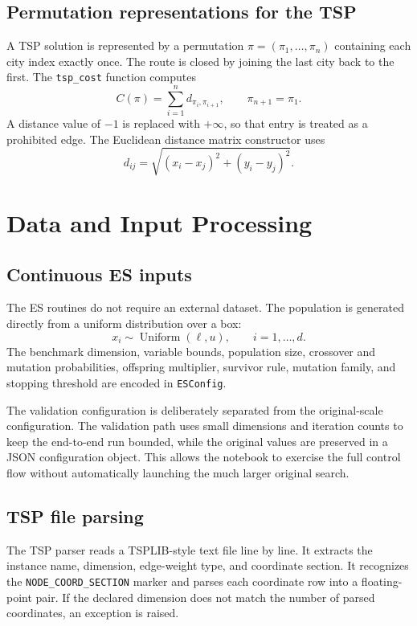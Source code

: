 \documentclass[11pt,a4paper]{article}
\newcommand{\code}[1]{\texttt{#1}}
\begin{document}
\subsection{Permutation representations for the TSP}
A TSP solution is represented by a permutation $\pi=(\pi_1,\ldots,\pi_n)$ containing each city index exactly once. The route is closed by joining the last city back to the first. The \code{tsp\_cost} function computes
\begin{equation}
C(\pi)=\sum_{i=1}^{n} d_{\pi_i,\pi_{i+1}},
\qquad \pi_{n+1}=\pi_1.
\end{equation}
A distance value of $-1$ is replaced with $+\infty$, so that entry is treated as a prohibited edge. The Euclidean distance matrix constructor uses
\begin{equation}
d_{ij}=\sqrt{(x_i-x_j)^2+(y_i-y_j)^2}.
\end{equation}

\section{Data and Input Processing}
\subsection{Continuous ES inputs}
The ES routines do not require an external dataset. The population is generated directly from a uniform distribution over a box:
\begin{equation}
x_i \sim \operatorname{Uniform}(\ell,u),
\qquad i=1,\ldots,d.
\end{equation}
The benchmark dimension, variable bounds, population size, crossover and mutation probabilities, offspring multiplier, survivor rule, mutation family, and stopping threshold are encoded in \code{ESConfig}.

The validation configuration is deliberately separated from the original-scale configuration. The validation path uses small dimensions and iteration counts to keep the end-to-end run bounded, while the original values are preserved in a JSON configuration object. This allows the notebook to exercise the full control flow without automatically launching the much larger original search.

\subsection{TSP file parsing}
The TSP parser reads a TSPLIB-style text file line by line. It extracts the instance name, dimension, edge-weight type, and coordinate section. It recognizes the \code{NODE\_COORD\_SECTION} marker and parses each coordinate row into a floating-point pair. If the declared dimension does not match the number of parsed coordinates, an exception is raised.
\end{document}
